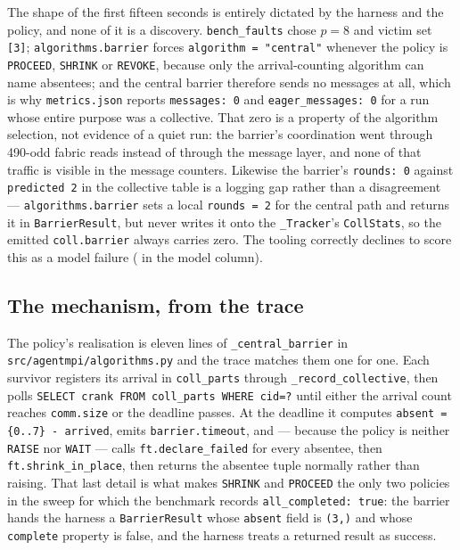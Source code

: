 \documentclass[11pt]{article}
\begin{document}
The shape of the first fifteen seconds is entirely dictated by the harness and the policy,
and none of it is a discovery. \texttt{bench\_faults} chose $p=8$ and victim set
\texttt{[3]}; \texttt{algorithms.barrier} forces \texttt{algorithm = "central"} whenever
the policy is \texttt{PROCEED}, \texttt{SHRINK} or \texttt{REVOKE}, because only the
arrival-counting algorithm can name absentees; and the central barrier therefore sends no
messages at all, which is why \texttt{metrics.json} reports \texttt{messages: 0} and
\texttt{eager\_messages: 0} for a run whose entire purpose was a collective. That zero is
a property of the algorithm selection, not evidence of a quiet run: the barrier's
coordination went through 490-odd fabric reads instead of through the message layer, and
none of that traffic is visible in the message counters. Likewise the barrier's
\texttt{rounds: 0} against \texttt{predicted 2} in the collective table is a logging gap
rather than a disagreement --- \texttt{algorithms.barrier} sets a local \texttt{rounds = 2}
for the central path and returns it in \texttt{BarrierResult}, but never writes it onto
the \texttt{\_Tracker}'s \texttt{CollStats}, so the emitted \texttt{coll.barrier} always
carries zero. The tooling correctly declines to score this as a model failure
(\modelna{} in the model column).

\subsection{The mechanism, from the trace}

The policy's realisation is eleven lines of \texttt{\_central\_barrier} in
\texttt{src/agentmpi/algorithms.py} and the trace matches them one for one. Each survivor
registers its arrival in \texttt{coll\_parts} through \texttt{\_record\_collective}, then
polls \texttt{SELECT crank FROM coll\_parts WHERE cid=?} until either the arrival count
reaches \texttt{comm.size} or the deadline passes. At the deadline it computes
\texttt{absent = \{0..7\} - arrived}, emits \texttt{barrier.timeout}, and --- because the
policy is neither \texttt{RAISE} nor \texttt{WAIT} --- calls \texttt{ft.declare\_failed}
for every absentee, then \texttt{ft.shrink\_in\_place}, then returns the absentee tuple
normally rather than raising. That last detail is what makes \texttt{SHRINK} and
\texttt{PROCEED} the only two policies in the sweep for which the benchmark records
\texttt{all\_completed:\ true}: the barrier hands the harness a
\texttt{BarrierResult} whose \texttt{absent} field is \texttt{(3,)} and whose
\texttt{complete} property is false, and the harness treats a returned result as success.
\end{document}
